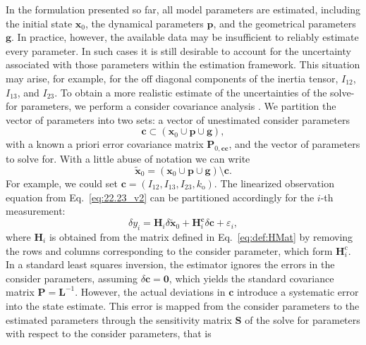 \documentclass[lineno, pdflatex,sn-mathphys-ay]{sn-jnl}
\theoremstyle{thmstyleone}%
\theoremstyle{thmstyletwo}%
\theoremstyle{thmstylethree}%
\renewcommand{\vec}[1]{\boldsymbol{#1}}
\begin{document}
In the formulation presented so far, all model parameters are estimated, including the initial state $\vec{x}_0$, the dynamical parameters $\vec{p}$, and the geometrical parameters $\vec{g}$. In practice, however, the available data may be insufficient to reliably estimate every parameter.
In such cases it is still desirable to account for the uncertainty associated with those parameters within the estimation framework. This situation may arise, for example, for the off diagonal components of the inertia tensor, $I_{12}$, $I_{13}$, and $I_{23}$.
To obtain a more realistic estimate of the uncertainties of the solve-for parameters, we perform a consider covariance analysis \citep[see, e.g.,][]{2004sod..book.....T}.
%
We partition the vector of parameters into two sets:  a vector of unestimated consider parameters 
\begin{equation}
	\label{eq:def}
	\vec{c} \subset \left( \vec{x}_0 \cup \vec{p} \cup \vec{g} \right),
\end{equation}
with a known a priori error covariance matrix $\vec{P}_{0,\vec{c}\vec{c}}$,
and the vector of parameters to solve for. With a little abuse of notation we can write 
%
\begin{equation}\label{eq:solve_for}
	\tilde{\vec{x}}_{0} = 
 	\left( \vec{x}_0 \cup \vec{p} \cup \vec{g} \right) \setminus \vec{c}.
\end{equation} 
%
For example, we could set ${\vec{c} = (I_{12}, I_{13}, I_{23}, k_{\mathrm{o}})}$.
%
The linearized observation equation from Eq.~\eqref{eq:22.23_v2} can be partitioned accordingly for the $i$-th measurement:
\begin{equation}
    \delta{y}_i = \vec{H}_{i} \delta \tilde{\vec{x}}_{0} + \vec{H}_{i}^{\vec{c}} \delta\vec{c} + \varepsilon_i,
\end{equation}
where $\vec{H}_{i}$ is obtained from the matrix defined in Eq.~\eqref{eq:def:HMat} by removing the rows and columns corresponding to the consider parameter, which form $\vec{H}_{i}^\mathrm{c}$.
%
In a standard least squares inversion, the estimator ignores the errors in the consider parameters, assuming ${\delta\vec{c} = \vec{0}}$, which yields the standard covariance matrix ${\vec{P} = \vec{L}^{-1}}$. However, the actual deviations in $\vec{c}$ introduce a systematic error into the state estimate. This error is mapped from the consider parameters to the estimated parameters through the sensitivity matrix $\vec{S}$ of the solve for parameters with respect to the consider parameters, that is
\end{document}
